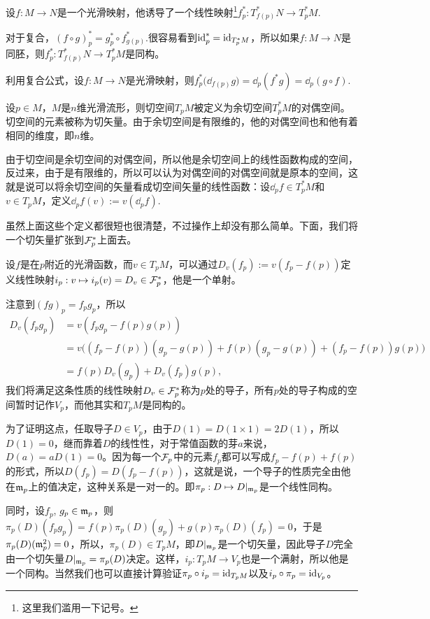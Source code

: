 \para 设$f:M\to N$是一个光滑映射，他诱导了一个线性映射\footnote{这里我们滥用一下记号。}$f^*_p:T_{f(p)}^*N\to T_p^*M$.

\para 对于复合，$(f\circ g)^*_p=g^*_p\circ f^*_{g(p)}$.很容易看到$\operatorname{id}^*_p=\operatorname{id}_{T_p^*M}$，所以如果$f:M\to N$是同胚，则$f_p^*:T_{f(p)}^*N\to T_p^*M$是同构。

\para 利用复合公式，设$f:M\to N$是光滑映射，则$f^*_p\bigl(\dd_{f(p)}g\bigr)=\dd_{p}(f^*g)=\dd_p(g\circ f)$.

\para 设$p\in M$，$M$是$n$维光滑流形，则{\kaishu 切空间}$T_pM$被定义为余切空间$T_p^*M$的对偶空间。切空间的元素被称为{\kaishu 切矢量}。由于余切空间是有限维的，他的对偶空间也和他有着相同的维度，即$n$维。

\para 由于切空间是余切空间的对偶空间，所以他是余切空间上的线性函数构成的空间，反过来，由于是有限维的，所以可以认为对偶空间的对偶空间就是原本的空间，这就是说可以将余切空间的矢量看成切空间矢量的线性函数：设$\dd_p f\in T_p^*M$和$v\in T_pM$，定义$\dd_p f(v):=v(\dd_p f)$.

虽然上面这些个定义都很短也很清楚，不过操作上却没有那么简单。下面，我们将一个切矢量扩张到$\mathcal{F}_p^*$上面去。


\para 设$f$是在$p$附近的光滑函数，而$v\in T_pM$，可以通过$D_v(f_p):=v(f_p-f(p))$定义线性映射$i_p:v\mapsto i_p(v)=D_v\in \mathcal{F}_p^*$，他是一个单射。

注意到$(fg)_p=f_pg_p$，所以
\begin{align*}
	D_v(f_pg_p)&=v(f_pg_p-f(p)g(p))\\
	&=v\bigl((f_p-f(p))(g_p-g(p))+f(p)(g_p-g(p))+(f_p-f(p))g(p)\bigr)\\
	&=f(p)D_v(g_p)+D_v(f_p)g(p),
\end{align*}
我们将满足这条性质的线性映射$D_v\in \mathcal{F}_p^*$称为$p$处的导子，所有$p$处的导子构成的空间暂时记作$V_p$，而他其实和$T_pM$是同构的。

为了证明这点，任取导子$D\in V_p$，由于$D(1)=D(1\times 1)=2D(1)$，所以$D(1)=0$，继而靠着$D$的线性性，对于常值函数的芽$a$来说，$D(a)=aD(1)=0$。因为每一个$\mathcal{F}_p$中的元素$f_p$都可以写成$f_p-f(p)+f(p)$的形式，所以$D(f_p)=D(f_p-f(p))$，这就是说，一个导子的性质完全由他在$\mathfrak{m}_p$上的值决定，这种关系是一对一的。即$\pi_p:D\mapsto D|_{\mathfrak{m}_p}$是一个线性同构。

同时，设$f_p$, $g_p\in \mathfrak{m}_p$，则$\pi_p(D)(f_pg_p)=f(p)\pi_p(D)(g_p)+g(p)\pi_p(D)(f_p)=0$，于是$\pi_p(D)(\mathfrak{m}_p^2)=0$，所以，$\pi_p(D)\in T_pM$，即$D|_{\mathfrak{m}_p}$是一个切矢量，因此导子$D$完全由一个切矢量$D|_{\mathfrak{m}_p}=\pi_p(D)$决定。这样，$i_p:T_pM\to V_p$也是一个满射，所以他是一个同构。当然我们也可以直接计算验证$\pi_p\circ i_p=\operatorname{id}_{T_pM}$以及$i_p\circ \pi_p=\operatorname{id}_{V_p}$。

